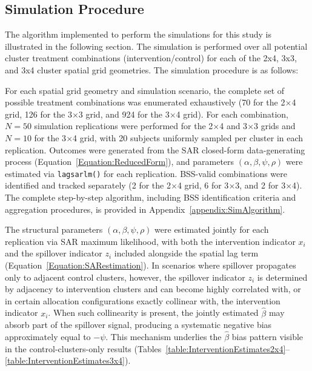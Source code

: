 \documentclass{article}[11pt]
\begin{document}
\subsection{Simulation Procedure}\label{section:SimProcedure}

The algorithm implemented to perform the simulations for this study is illustrated in the following section. The simulation is performed over all potential cluster treatment combinations (intervention/control) for each of the 2x4, 3x3, and 3x4 cluster spatial grid geometries. The simulation procedure is as follows:

For each spatial grid geometry and simulation scenario, the complete set of possible treatment combinations was enumerated exhaustively (70 for the 2$\times$4 grid, 126 for the 3$\times$3 grid, and 924 for the 3$\times$4 grid). For each combination, $N = 50$ simulation replications were performed for the 2$\times$4 and 3$\times$3 grids and $N = 10$ for the 3$\times$4 grid, with 20 subjects uniformly sampled per cluster in each replication. Outcomes were generated from the SAR closed-form data-generating process (Equation~\ref{Equation:ReducedForm}), and parameters $(\alpha, \beta, \psi, \rho)$ were estimated via \texttt{lagsarlm()} for each replication. BSS-valid combinations were identified and tracked separately (2 for the 2$\times$4 grid, 6 for 3$\times$3, and 2 for 3$\times$4). The complete step-by-step algorithm, including BSS identification criteria and aggregation procedures, is provided in Appendix~\ref{appendix:SimAlgorithm}.

The structural parameters $(\alpha, \beta, \psi, \rho)$ were estimated jointly for each replication via SAR maximum likelihood, with both the intervention indicator $x_i$ and the spillover indicator $z_i$ included alongside the spatial lag term (Equation~\ref{Equation:SARestimation}). In scenarios where spillover propagates only to adjacent control clusters, however, the spillover indicator $z_i$ is determined by adjacency to intervention clusters and can become highly correlated with, or in certain allocation configurations exactly collinear with, the intervention indicator $x_i$. When such collinearity is present, the jointly estimated $\hat{\beta}$ may absorb part of the spillover signal, producing a systematic negative bias approximately equal to $-\psi$. This mechanism underlies the $\hat{\beta}$ bias pattern visible in the control-clusters-only results (Tables~\ref{table:InterventionEstimates2x4}--\ref{table:InterventionEstimates3x4}).
\end{document}
